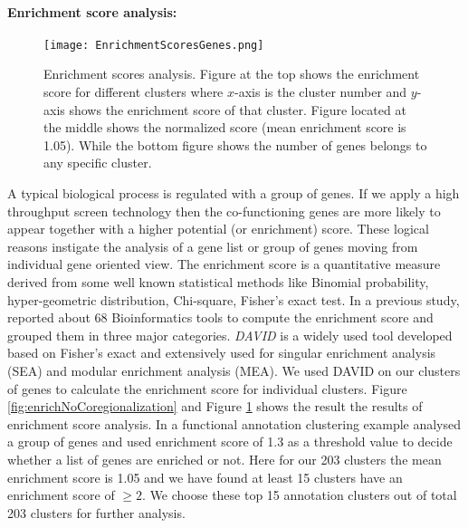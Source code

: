 \paragraph{Enrichment score analysis:}
\begin{figure}
 \begin{center}
 \texttt{[image: EnrichmentScoresGenes.png]}
  \caption [Enrichment scores analysis for different clusters with \emph{coregionalization}] 
  {Enrichment scores analysis. Figure at the top shows the enrichment score for different clusters where $x$-axis is the cluster number and $y$-axis shows the enrichment score of that cluster. Figure located at the middle shows the normalized score (mean enrichment score is 1.05). While the bottom figure shows the number of genes belongs to any specific cluster.
  \label{fig:EnrichmentScores}}
 \end{center}
\end{figure}

A typical biological process is regulated with a group of genes. If we apply a high throughput screen technology then the co-functioning genes are more likely to appear together with a higher potential (or enrichment) score. These logical reasons instigate the analysis of a gene list or group of genes moving from individual gene oriented view. The enrichment score is a quantitative measure derived from some well known statistical methods like Binomial probability, hyper-geometric distribution, Chi-square, Fisher's exact test. In a previous study, \cite{Huang:2009Enrichment} reported about 68 Bioinformatics tools to compute the enrichment score and grouped them in three major categories. \emph{DAVID} \cite{Huang:2009David} is a widely used tool developed based on Fisher's exact and extensively used for singular enrichment analysis (SEA) and modular enrichment analysis (MEA). We used DAVID on our clusters of genes to calculate the enrichment score for individual clusters.  Figure \ref{fig:enrichNoCoregionalization} and Figure \ref{fig:EnrichmentScores} shows the result the results of enrichment score analysis. In a functional annotation clustering example \cite{Huang:2007} analysed a group of genes and used enrichment score of 1.3 as a threshold value to decide whether a list of genes are enriched or not. Here for our 203 clusters the mean enrichment score is 1.05 and we have found at least 15 clusters have an enrichment score of $\geq 2$. We choose these top 15 annotation clusters out of total 203 clusters for further analysis.

